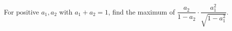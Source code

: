 For positive $a_1,a_2$ with $a_1+a_2=1$, find the maximum of $\dfrac{a_2}{1-a_2}\cdot\dfrac{a_1^2}{\sqrt{1-a_1^2}}$.
